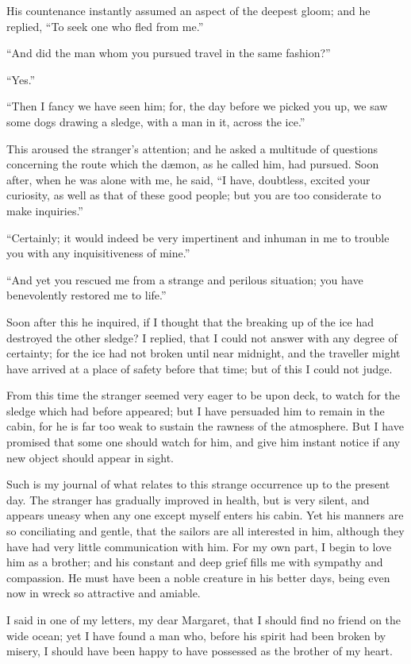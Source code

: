 His countenance instantly assumed
an aspect of the deepest gloom; and he
replied, ``To seek one who fled from
me.''

``And did the man whom you pursued
travel in the same fashion?''

``Yes.''

``Then I fancy we have seen him;
for, the day before we picked you up,
we saw some dogs drawing a sledge,
with a man in it, across the ice.''

This aroused the stranger's attention;
and he asked a multitude of questions
concerning the route which the
dæmon, as he called him, had pursued.
Soon after, when he was alone with me,
he said, ``I have, doubtless, excited your
curiosity, as well as that of these good
people; but you are too considerate to
make inquiries.''

``Certainly; it would indeed be very
impertinent and inhuman in me to
trouble you with any inquisitiveness of
mine.''

``And yet you rescued me from a
strange and perilous situation; you
have benevolently restored me to life.''

Soon after this he inquired, if I
thought that the breaking up of the ice
had destroyed the other sledge? I replied,
that I could not answer with any
degree of certainty; for the ice had
not broken until near midnight, and
the traveller might have arrived at a
place of safety before that time; but of
this I could not judge.

From this time the stranger seemed
very eager to be upon deck, to watch
for the sledge which had before appeared;
but I have persuaded him to remain
in the cabin, for he is far too weak to
sustain the rawness of the atmosphere.
But I have promised that some one
should watch for him, and give him
instant notice if any new object should
appear in sight.

Such is my journal of what relates
to this strange occurrence up to the
present day. The stranger has gradually
improved in health, but is very
silent, and appears uneasy when any
one except myself enters his cabin.
Yet his manners are so conciliating
and gentle, that the sailors are all interested
in him, although they have
had very little communication with
him. For my own part, I begin to
love him as a brother; and his constant
and deep grief fills me with sympathy
and compassion. He must have
been a noble creature in his better
days, being even now in wreck so attractive
and amiable.

I said in one of my letters, my dear
Margaret, that I should find no friend
on the wide ocean; yet I have found a
man who, before his spirit had been
broken by misery, I should have been
happy to have possessed as the brother
of my heart.

